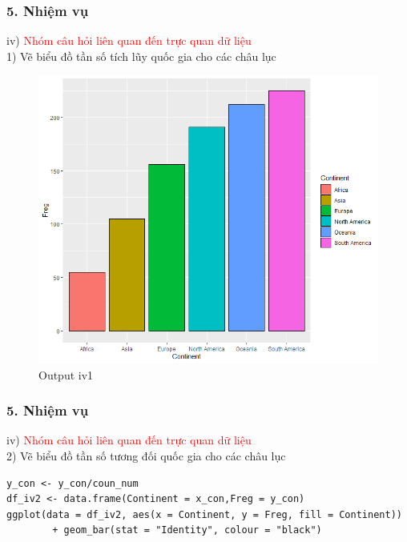 \documentclass[english,10pt,table]{beamer}
\begin{document}
\begin{frame}[fragile]
\frametitle{5.  Nhiệm vụ}
iv) \textcolor{red}{Nhóm câu hỏi liên quan đến trực quan dữ liệu}\\
   1) Vẽ biểu đồ tần số tích lũy quốc gia cho các châu lục
	\begin{figure}[h!]
	\begin{center}
		    \includegraphics[scale = 0.4]{Images/IV/iv (1).png}
		     \caption{Output iv1}
		\end{center}
		\end{figure}
\end{frame}

\begin{frame}[fragile]
\frametitle{5.  Nhiệm vụ}
iv) \textcolor{red}{Nhóm câu hỏi liên quan đến trực quan dữ liệu}\\
    2) Vẽ biểu đồ tần số tương đối quốc gia cho các châu lục
\begin{lstlisting}[frame=single,basicstyle=\tiny]  
y_con <- y_con/coun_num
df_iv2 <- data.frame(Continent = x_con,Freg = y_con)
ggplot(data = df_iv2, aes(x = Continent, y = Freg, fill = Continent)) 
        + geom_bar(stat = "Identity", colour = "black")
\end{lstlisting}
\end{frame}
\end{document}
